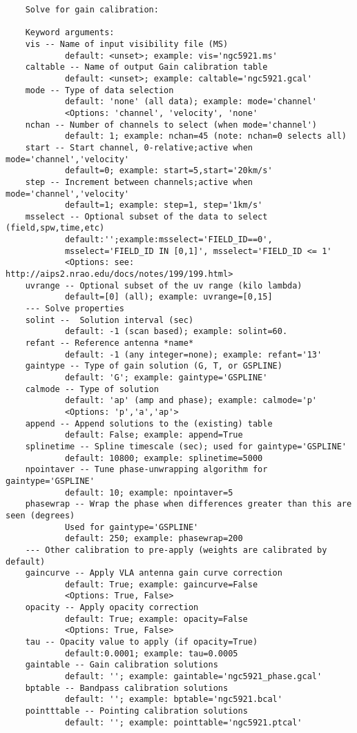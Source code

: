 \vspace{3mm}
\small
\begin{verbatim}
    Solve for gain calibration:
    
    Keyword arguments:
    vis -- Name of input visibility file (MS)
            default: <unset>; example: vis='ngc5921.ms'
    caltable -- Name of output Gain calibration table
            default: <unset>; example: caltable='ngc5921.gcal'
    mode -- Type of data selection
            default: 'none' (all data); example: mode='channel'
            <Options: 'channel', 'velocity', 'none'
    nchan -- Number of channels to select (when mode='channel')
            default: 1; example: nchan=45 (note: nchan=0 selects all)
    start -- Start channel, 0-relative;active when mode='channel','velocity'
            default=0; example: start=5,start='20km/s'
    step -- Increment between channels;active when mode='channel','velocity'
            default=1; example: step=1, step='1km/s'
    msselect -- Optional subset of the data to select (field,spw,time,etc)
            default:'';example:msselect='FIELD_ID==0', 
            msselect='FIELD_ID IN [0,1]', msselect='FIELD_ID <= 1'
            <Options: see: http://aips2.nrao.edu/docs/notes/199/199.html>
    uvrange -- Optional subset of the uv range (kilo lambda)
            default=[0] (all); example: uvrange=[0,15]
    --- Solve properties
    solint --  Solution interval (sec)
            default: -1 (scan based); example: solint=60.
    refant -- Reference antenna *name*
            default: -1 (any integer=none); example: refant='13'
    gaintype -- Type of gain solution (G, T, or GSPLINE)
            default: 'G'; example: gaintype='GSPLINE'
    calmode -- Type of solution
            default: 'ap' (amp and phase); example: calmode='p'
            <Options: 'p','a','ap'>
    append -- Append solutions to the (existing) table
            default: False; example: append=True
    splinetime -- Spline timescale (sec); used for gaintype='GSPLINE'
            default: 10800; example: splinetime=5000
    npointaver -- Tune phase-unwrapping algorithm for gaintype='GSPLINE'
            default: 10; example: npointaver=5
    phasewrap -- Wrap the phase when differences greater than this are seen (degrees)
            Used for gaintype='GSPLINE'
            default: 250; example: phasewrap=200
    --- Other calibration to pre-apply (weights are calibrated by default)
    gaincurve -- Apply VLA antenna gain curve correction
            default: True; example: gaincurve=False
            <Options: True, False>
    opacity -- Apply opacity correction
            default: True; example: opacity=False
            <Options: True, False>
    tau -- Opacity value to apply (if opacity=True)
            default:0.0001; example: tau=0.0005
    gaintable -- Gain calibration solutions
            default: ''; example: gaintable='ngc5921_phase.gcal'
    bptable -- Bandpass calibration solutions
            default: ''; example: bptable='ngc5921.bcal'
    pointttable -- Pointing calibration solutions
            default: ''; example: pointtable='ngc5921.ptcal'
\end{verbatim}
\normalsize

